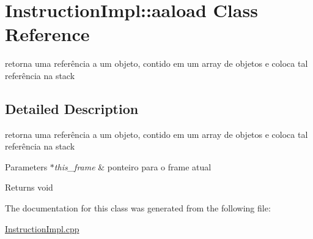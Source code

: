 \hypertarget{class_instruction_impl_1_1aaload}{}\section{Instruction\+Impl\+:\+:aaload Class Reference}
\label{class_instruction_impl_1_1aaload}


retorna uma referência a um objeto, contido em um array de objetos e coloca tal referência na stack  




\subsection{Detailed Description}
retorna uma referência a um objeto, contido em um array de objetos e coloca tal referência na stack 


\begin{DoxyParams}{Parameters}
{\em $\ast$this\+\_\+frame} & ponteiro para o frame atual \\
\hline
\end{DoxyParams}
\begin{DoxyReturn}{Returns}
void 
\end{DoxyReturn}


The documentation for this class was generated from the following file\+:\begin{DoxyCompactItemize}
\item 
\hyperlink{_instruction_impl_8cpp}{Instruction\+Impl.\+cpp}\end{DoxyCompactItemize}
